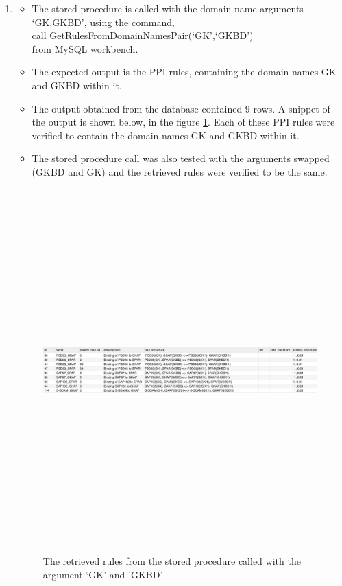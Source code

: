 \documentclass[msc,deptreport,ai]{infthesis}      %
\begin{document}
\begin{enumerate}
	\item 
\begin{itemize}
	\item 	The stored procedure is called with the domain name arguments `GK,GKBD', using the command, \\
	call GetRulesFromDomainNamesPair(`GK',`GKBD')\\
	from MySQL workbench. 
	\item The expected output is the PPI rules, containing the domain names GK and GKBD within it.
	\item The output obtained from the database contained 9 rows. A snippet of the output is shown below, in the figure \ref{fig:DomainNameOutput2}. Each of these PPI rules were verified to contain the domain names GK and GKBD within it.
	\item The stored procedure call was also tested with the arguments swapped (GKBD and GK) and the retrieved rules were verified to be the same.		
\end{itemize}
\begin{figure}[H]
	\centering
	\captionsetup{justification=centering}
	\includegraphics[width=\linewidth,height=14cm,keepaspectratio]{DomainNameOutput2.png}	
	\caption{The retrieved rules from the stored procedure called with the argument `GK' and 'GKBD'}
	\label{fig:DomainNameOutput2}		
\end{figure}
\end{enumerate}
\end{document}
